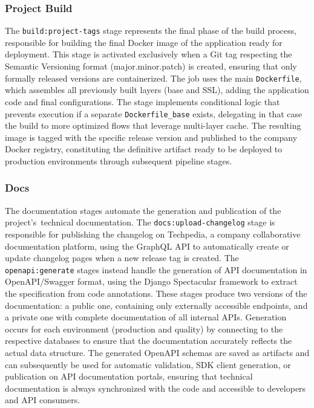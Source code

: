 \subsubsection{Project Build}
The \texttt{build:project-tags} stage represents the final phase of the build process, responsible for building the final Docker image of the application ready for deployment. This stage is activated exclusively when a Git tag respecting the Semantic Versioning format (major.minor.patch) is created, ensuring that only formally released versions are containerized. The job uses the main \texttt{Dockerfile}, which assembles all previously built layers (base and SSL), adding the application code and final configurations. The stage implements conditional logic that prevents execution if a separate \texttt{Dockerfile\_base} exists, delegating in that case the build to more optimized flows that leverage multi-layer cache. The resulting image is tagged with the specific release version and published to the company Docker registry, constituting the definitive artifact ready to be deployed to production environments through subsequent pipeline stages.

\subsubsection{Docs}
The documentation stages automate the generation and publication of the project's~technical documentation. The \texttt{docs:upload-changelog} stage is responsible for publishing the changelog on Techpedia, a company collaborative documentation platform, using the GraphQL API to automatically create or update changelog pages when a new release tag is created. The \texttt{openapi:generate} stages instead handle the generation of API documentation in OpenAPI/Swagger format, using the Django Spectacular framework to extract the specification from code annotations. These stages produce two versions of the documentation: a public one, containing only externally accessible endpoints, and a private one with complete documentation of all internal APIs. Generation occurs for each environment (production and quality) by connecting to the respective databases to ensure that the documentation accurately reflects the actual data structure. The generated OpenAPI schemas are saved as artifacts and can subsequently be used for automatic validation, SDK client generation, or publication on API documentation portals, ensuring that technical documentation is always synchronized with the code and accessible to developers and API consumers.

